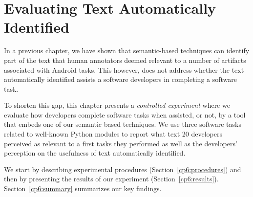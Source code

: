 \setcounter{chapter}{5}
\setcounter{rq}{1}


\chapter{Evaluating Text Automatically Identified}
\label{ch:assisting}



In a previous chapter, we have shown that semantic-based techniques can identify part of the text 
that human annotators deemed relevant to a number of artifacts associated with Android tasks.
This however, does not address whether the text automatically identified assists a software developers
 in completing a software task.



To shorten this gap, this chapter presents a \textit{controlled experiment} 
where we evaluate how developers complete software tasks when assisted, or not, by a tool that 
embeds one of our semantic based techniques. 
We use three software tasks related to well-known Python modules to
report what text 20 developers perceived as relevant to a first tasks they performed
as well as the developers' perception on the usefulness of text automatically identified. 


We start by describing experimental procedures (Section~\ref{cp6:procedures}) and then by presenting the results of our experiment (Section~\ref{cp6:results}). Section~\ref{cp6:summary} summarizes our key findings.






